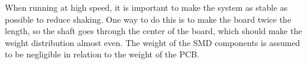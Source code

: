 When running at high speed, it is important to make the system as stable as possible to reduce shaking.
One way to do this is to make the board twice the length, so the shaft goes through the center of the board, 
which should make the weight distribution almost even.
The weight of the SMD components is assumed to be negligible in relation to the weight of the PCB.
